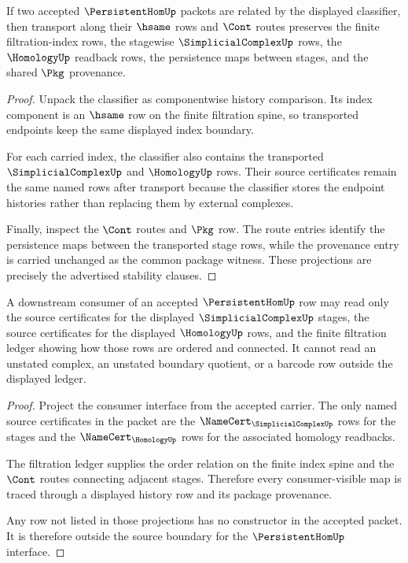 \begin{theorem}
\label{thm:persistenthom-filtration-classifier-stability}
If two accepted $\PersistentHomUp$ packets are related by the displayed
classifier, then transport along their $\hsame$ rows and $\Cont$ routes
preserves the finite filtration-index rows, the stagewise
$\SimplicialComplexUp$ rows, the $\HomologyUp$ readback rows, the persistence
maps between stages, and the shared $\Pkg$ provenance.
\end{theorem}
\begin{proof}
Unpack the classifier as componentwise history comparison. Its index component
is an $\hsame$ row on the finite filtration spine, so transported endpoints keep
the same displayed index boundary.

For each carried index, the classifier also contains the transported
$\SimplicialComplexUp$ and $\HomologyUp$ rows. Their source certificates remain
the same named rows after transport because the classifier stores the endpoint
histories rather than replacing them by external complexes.

Finally, inspect the $\Cont$ routes and $\Pkg$ row. The route entries identify
the persistence maps between the transported stage rows, while the provenance
entry is carried unchanged as the common package witness. These projections are
precisely the advertised stability clauses.
\end{proof}

\begin{theorem}
\label{thm:persistenthom-simplicial-homology-source-boundary}
A downstream consumer of an accepted $\PersistentHomUp$ row may read only the
source certificates for the displayed $\SimplicialComplexUp$ stages, the source
certificates for the displayed $\HomologyUp$ rows, and the finite filtration
ledger showing how those rows are ordered and connected. It cannot read an
unstated complex, an unstated boundary quotient, or a barcode row outside the
displayed ledger.
\end{theorem}
\begin{proof}
Project the consumer interface from the accepted carrier. The only named source
certificates in the packet are the $\NameCert_{\SimplicialComplexUp}$ rows for
the stages and the $\NameCert_{\HomologyUp}$ rows for the associated homology
readbacks.

The filtration ledger supplies the order relation on the finite index spine and
the $\Cont$ routes connecting adjacent stages. Therefore every consumer-visible
map is traced through a displayed history row and its package provenance.

Any row not listed in those projections has no constructor in the accepted
packet. It is therefore outside the source boundary for the
$\PersistentHomUp$ interface.
\end{proof}

